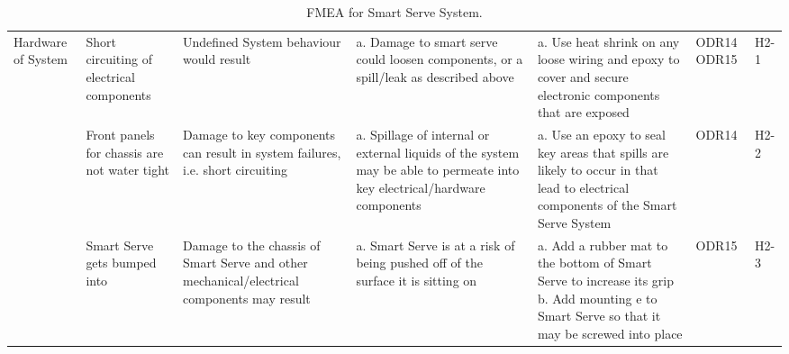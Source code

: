 \documentclass{article}
\begin{document}
\begin{rotate}{}
\begin{landscape}
\begin{table}
\begin{tabular}{|p{1.75cm}|p{4cm}|p{4cm}|p{4cm}|p{4cm}|p{1cm}|p{0.75cm}|}
            \hline
            Hardware of System & Short circuiting of electrical components & Undefined System behaviour would result & a. Damage to smart serve could loosen components, or a spill/leak as described above & a. Use heat shrink on any loose wiring and epoxy to cover and secure electronic components that are exposed & ODR14 ODR15 & H2-1\\
            \cline{2-7}
            & Front panels for chassis are not water tight & Damage to key components can result in system failures, i.e. short circuiting & a. Spillage of internal or external liquids of the system may be able to permeate into key electrical/hardware components & a. Use an epoxy to seal key areas that spills are likely to occur in that lead to electrical components of the Smart Serve System & ODR14 & H2-2 \\ 
            \cline{2-7}
            & Smart Serve gets bumped into & Damage to the chassis of Smart Serve and other mechanical/electrical components may result & a. Smart Serve is at a risk of being pushed off of the surface it is sitting on & a. Add a rubber mat to the bottom of Smart Serve to increase its grip  b. Add mounting e to Smart Serve so that it may be screwed into place & ODR15 & H2-3 \\
            \hline
            
            \end{tabular}
            \caption{FMEA for Smart Serve System.}
            \label{tab: caption}
        \end{table}
    \end{landscape}
    \end{rotate}
\end{document}
